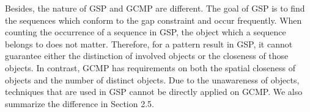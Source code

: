{Besides, the nature of GSP and GCMP are different. The goal of GSP 
is to find the sequences which conform to the gap constraint and occur frequently.
When counting the occurrence of a sequence in GSP, the object
which a sequence belongs to does not matter. Therefore, for
a pattern result in GSP, it cannot guarantee either the 
distinction of involved objects or the closeness of those objects.
In contrast, GCMP has requirements on both the spatial closeness 
of objects and the number of distinct objects.
Due to the unawareness of objects, techniques that are used in GSP 
cannot be directly applied on GCMP. We also summarize the difference
in Section 2.5.
%
%
%
%
%
%
}

